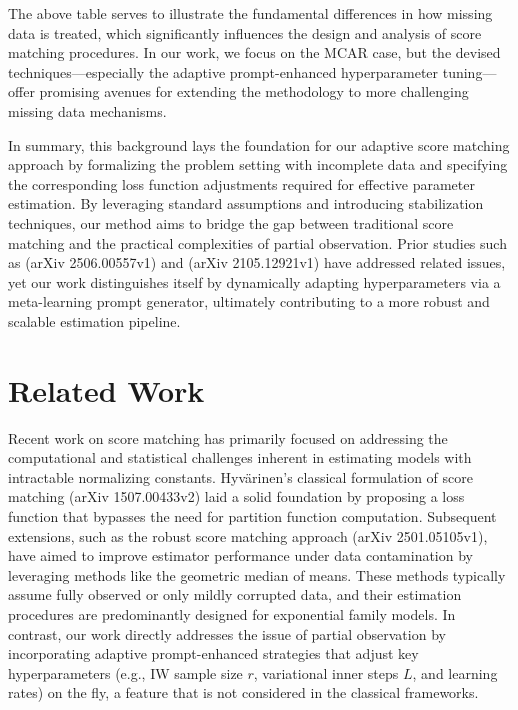\documentclass{article}
\begin{document}
The above table serves to illustrate the fundamental differences in how missing data is treated, which significantly influences the design and analysis of score matching procedures. In our work, we focus on the MCAR case, but the devised techniques—especially the adaptive prompt-enhanced hyperparameter tuning—offer promising avenues for extending the methodology to more challenging missing data mechanisms.

In summary, this background lays the foundation for our adaptive score matching approach by formalizing the problem setting with incomplete data and specifying the corresponding loss function adjustments required for effective parameter estimation. By leveraging standard assumptions and introducing stabilization techniques, our method aims to bridge the gap between traditional score matching and the practical complexities of partial observation. Prior studies such as (arXiv 2506.00557v1) and (arXiv 2105.12921v1) have addressed related issues, yet our work distinguishes itself by dynamically adapting hyperparameters via a meta-learning prompt generator, ultimately contributing to a more robust and scalable estimation pipeline.

\section{Related Work}
Recent work on score matching has primarily focused on addressing the computational and statistical challenges inherent in estimating models with intractable normalizing constants. Hyv\"arinen's classical formulation of score matching (arXiv 1507.00433v2) laid a solid foundation by proposing a loss function that bypasses the need for partition function computation. Subsequent extensions, such as the robust score matching approach (arXiv 2501.05105v1), have aimed to improve estimator performance under data contamination by leveraging methods like the geometric median of means. These methods typically assume fully observed or only mildly corrupted data, and their estimation procedures are predominantly designed for exponential family models. In contrast, our work directly addresses the issue of partial observation by incorporating adaptive prompt-enhanced strategies that adjust key hyperparameters (e.g., IW sample size $r$, variational inner steps $L$, and learning rates) on the fly, a feature that is not considered in the classical frameworks.
\end{document}
